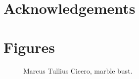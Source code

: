 \documentclass[fleqn]{scrartcl}%
\begin{document}
    \clearpage
    \section*{Acknowledgements}
    \blindtext

    \clearpage
    
    


    \clearpage
    \section*{Figures}

    \begin{figure}[ht]%
        \caption {Marcus Tullius Cicero, marble bust.}
        \label{fig:tullius}
    \end{figure}
\end{document}
